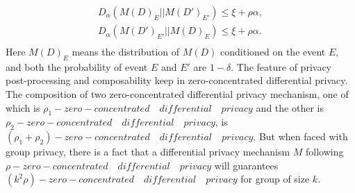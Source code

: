 \documentclass[conference]{IEEEtran}
\begin{document}
\begin{equation}
    \begin{split}
        D_{\alpha}(M(D)_E||M(D')_{E'}) \leq \xi + \rho \alpha,\\
        D_{\alpha}(M(D')_{E'}||M(D)_E) \leq \xi + \rho \alpha.\\
    \end{split}
\end{equation}
Here $M(D)_E$ means the distribution of $M(D)$ conditioned on the event $E$, and both the probability of event $E$ and $E'$ are $1-\delta$. The feature of privacy post-processing and composability keep in zero-concentrated differential privacy. The composition of two zero-concentrated differential privacy mechanism, one of which is $\rho_1-zero-concentrated \quad differential \quad privacy$ and the other is $\rho_2-zero-concentrated \quad differential \quad privacy$, is $(\rho_1 + \rho_2)-zero-concentrated \quad differential \quad privacy$. But when faced with group privacy, there is a fact that a differential privacy mechanism $M$ following $\rho-zero-concentrated \quad differential \quad privacy$ will guarantees $(k^2\rho)-zero-concentrated \quad differential \quad privacy$ for group of size $k$.
\end{document}
